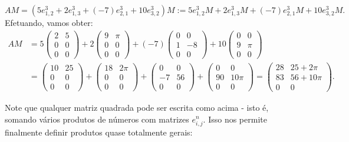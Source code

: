 \[AM=(5e^3_{1,2}+2e^3_{1,3}+(-7)e^3_{2,1}+10e^3_{3,2})M:=5e^3_{1,2}M+2e^3_{1,3}M+(-7)e^3_{2,1}M+10e^3_{3,2}M.\] Efetuando, vamos obter:
\begin{align*}
AM&=5\begin{pmatrix}
2 & 5\\
0 & 0\\
0 & 0
\end{pmatrix}+2\begin{pmatrix}
9 & \pi\\
0 & 0\\
0 & 0
\end{pmatrix}+(-7)\begin{pmatrix}
0 & 0\\
1 & -8\\
0 & 0
\end{pmatrix}+10\begin{pmatrix}
0 & 0\\
9 & \pi\\
0 & 0
\end{pmatrix}\\
&=\begin{pmatrix}
10 & 25\\
0 & 0\\
0 & 0
\end{pmatrix}+\begin{pmatrix}
18 & 2\pi\\
0 & 0\\
0 & 0
\end{pmatrix}+\begin{pmatrix}
0 & 0\\
-7 & 56\\
0 & 0
\end{pmatrix}+\begin{pmatrix}
0 & 0\\
90 & 10\pi\\
0 & 0
\end{pmatrix}=\begin{pmatrix}
28 & 25+2\pi\\
83 & 56+10\pi\\
0 & 0
\end{pmatrix}.
\end{align*}

\begin{rmk}
	Note que qualquer matriz quadrada pode ser escrita como acima - isto é, somando vários produtos de números com matrizes $e^n_{i,j}$. Isso nos permite finalmente definir produtos quase totalmente gerais:
\end{rmk}

